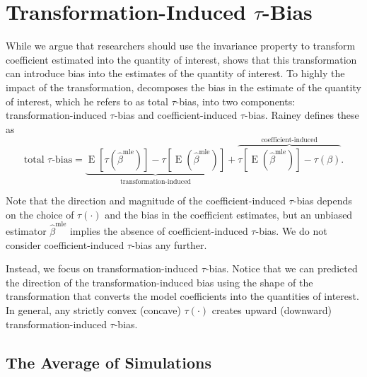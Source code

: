 \documentclass[11pt]{article}
\DeclareMathOperator*{\E}{\text{E}}
\begin{document}
\section*{Transformation-Induced $\tau$-Bias}

While we argue that researchers should use the invariance property to transform coefficient estimated into the quantity of interest, \cite{Rainey2017} shows that this transformation can introduce bias into the estimates of the quantity of interest.
To highly the impact of the transformation, \citet[p. 404]{Rainey2017} decomposes the bias in the estimate of the quantity of interest, which he refers to as total $\tau$-bias, into two components: transformation-induced $\tau$-bias and coefficient-induced $\tau$-bias. 
Rainey defines these as
\begin{equation}
\text{total } \tau\text{-bias}= \underbrace{ \E[\tau(\hat{\beta}^\text{mle})]-  \tau[\E(\hat{\beta}^\text{mle})]  }_{\text{transformation-induced}} + \overbrace{  \tau[\E(\hat{\beta}^\text{mle})] - \tau(\beta)  }^{\text{coefficient-induced}}\text{.} \label{eqn:ti-bias}
\end{equation}

Note that the direction and magnitude of the coefficient-induced $\tau$-bias depends on the choice of $\tau(\cdot)$ and the bias in the coefficient estimates, but an unbiased estimator $\hat{\beta}^\text{mle}$ implies the absence of coefficient-induced $\tau$-bias. 
We do not consider coefficient-induced $\tau$-bias any further.

Instead, we focus on transformation-induced $\tau$-bias.
Notice that we can predicted the direction of the transformation-induced bias using the shape of the transformation that converts the model coefficients into the quantities of interest.
In general, any strictly convex (concave) $\tau(\cdot)$ creates upward (downward) transformation-induced $\tau$-bias.

\subsection*{The Average of Simulations}
\end{document}
